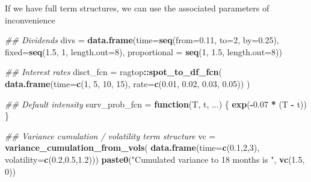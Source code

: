 \documentclass[]{article}
\newenvironment{Shaded}{\begin{snugshade}}{\end{snugshade}}
\newcommand{\CommentTok}[1]{\textcolor[rgb]{0.56,0.35,0.01}{\textit{#1}}}
\newcommand{\ControlFlowTok}[1]{\textcolor[rgb]{0.13,0.29,0.53}{\textbf{#1}}}
\newcommand{\DataTypeTok}[1]{\textcolor[rgb]{0.13,0.29,0.53}{#1}}
\newcommand{\DecValTok}[1]{\textcolor[rgb]{0.00,0.00,0.81}{#1}}
\newcommand{\FloatTok}[1]{\textcolor[rgb]{0.00,0.00,0.81}{#1}}
\newcommand{\KeywordTok}[1]{\textcolor[rgb]{0.13,0.29,0.53}{\textbf{#1}}}
\newcommand{\NormalTok}[1]{#1}
\newcommand{\OperatorTok}[1]{\textcolor[rgb]{0.81,0.36,0.00}{\textbf{#1}}}
\newcommand{\StringTok}[1]{\textcolor[rgb]{0.31,0.60,0.02}{#1}}
\begin{document}
If we have full term structures, we can use the associated parameters of
inconvenience

\begin{Shaded}
\begin{Highlighting}[]
\CommentTok{## Dividends}
\NormalTok{divs =}\StringTok{ }\KeywordTok{data.frame}\NormalTok{(}\DataTypeTok{time=}\KeywordTok{seq}\NormalTok{(}\DataTypeTok{from=}\FloatTok{0.11}\NormalTok{, }\DataTypeTok{to=}\DecValTok{2}\NormalTok{, }\DataTypeTok{by=}\FloatTok{0.25}\NormalTok{),}
                  \DataTypeTok{fixed=}\KeywordTok{seq}\NormalTok{(}\FloatTok{1.5}\NormalTok{, }\DecValTok{1}\NormalTok{, }\DataTypeTok{length.out=}\DecValTok{8}\NormalTok{),}
                  \DataTypeTok{proportional =} \KeywordTok{seq}\NormalTok{(}\DecValTok{1}\NormalTok{, }\FloatTok{1.5}\NormalTok{, }\DataTypeTok{length.out=}\DecValTok{8}\NormalTok{))}

\CommentTok{## Interest rates}
\NormalTok{disct_fcn =}\StringTok{ }\NormalTok{ragtop}\OperatorTok{::}\KeywordTok{spot_to_df_fcn}\NormalTok{(}
  \KeywordTok{data.frame}\NormalTok{(}\DataTypeTok{time=}\KeywordTok{c}\NormalTok{(}\DecValTok{1}\NormalTok{, }\DecValTok{5}\NormalTok{, }\DecValTok{10}\NormalTok{, }\DecValTok{15}\NormalTok{),}
             \DataTypeTok{rate=}\KeywordTok{c}\NormalTok{(}\FloatTok{0.01}\NormalTok{, }\FloatTok{0.02}\NormalTok{, }\FloatTok{0.03}\NormalTok{, }\FloatTok{0.05}\NormalTok{))}
\NormalTok{)}

\CommentTok{## Default intensity}
\NormalTok{surv_prob_fcn =}\StringTok{ }\ControlFlowTok{function}\NormalTok{(T, t, ...) \{}
  \KeywordTok{exp}\NormalTok{(}\OperatorTok{-}\FloatTok{0.07} \OperatorTok{*}\StringTok{ }\NormalTok{(T }\OperatorTok{-}\StringTok{ }\NormalTok{t)) \}}

\CommentTok{## Variance cumulation / volatility term structure}
\NormalTok{vc =}\StringTok{ }\KeywordTok{variance_cumulation_from_vols}\NormalTok{(}
   \KeywordTok{data.frame}\NormalTok{(}\DataTypeTok{time=}\KeywordTok{c}\NormalTok{(}\FloatTok{0.1}\NormalTok{,}\DecValTok{2}\NormalTok{,}\DecValTok{3}\NormalTok{),}
              \DataTypeTok{volatility=}\KeywordTok{c}\NormalTok{(}\FloatTok{0.2}\NormalTok{,}\FloatTok{0.5}\NormalTok{,}\FloatTok{1.2}\NormalTok{)))}
\KeywordTok{paste0}\NormalTok{(}\StringTok{"Cumulated variance to 18 months is "}\NormalTok{, }\KeywordTok{vc}\NormalTok{(}\FloatTok{1.5}\NormalTok{, }\DecValTok{0}\NormalTok{))}
\end{Highlighting}
\end{Shaded}
\end{document}
